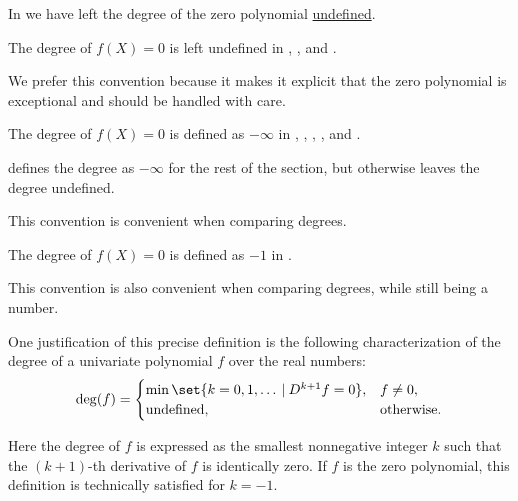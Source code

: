 \begin{remark}\label{rem:zero_polynomial_degree}
  In  we have left the degree of the zero polynomial \hyperref[con:undefinedness]{undefined}.

  \begin{thmenum}
     The degree of \( f(X) = 0 \) is left undefined in
    \cite[42]{Rotman2015AdvancedModernAlgebraPart1},
    \cite[118]{Тыртышников2017ОсновыАлгебры},
    \cite[132]{Курош1968КурсВысшейАлгебры} and
    \cite[22]{ГеновМиховскиМоллов1991Алгебра}.

    We prefer this convention because it makes it explicit that the zero polynomial is exceptional and should be handled with care.

     The degree of \( f(X) = 0 \) is defined as \( -\infty \) in
    \cite[97]{Lang2002Algebra},
    \cite[128]{Jacobson1985BasicAlgebraI},
    \cite[125]{Aluffi2009Algebra},
    \cite[28]{Ahlfors1979ComplexAnalysis},
    \cite[93]{Винберг2014КурсАлгебры} and
    \cite[183]{Кострикин2000АлгебраЧасть1}.

     defines the degree as \( -\infty \) for the rest of the section, but otherwise leaves the degree undefined.

    This convention is convenient when comparing degrees.

     The degree of \( f(X) = 0 \) is defined as \( -1 \) in
    \cite[10]{FriedbergInselSpence2018LinearAlgebra}.

    This convention is also convenient when comparing degrees, while still being a number.

    One justification of this precise definition is the following characterization of the degree of a univariate polynomial \( f \) over the real numbers:
    \begin{equation*}
      \deg(f) = \begin{cases}
        \min\set{ k = 0, 1, \ldots \given D^{k+1} f = 0 }, &f \neq 0, \\
        \T{undefined},                                     &\T{otherwise.}
      \end{cases}
    \end{equation*}

    Here the degree of \( f \) is expressed as the smallest nonnegative integer \( k \) such that the \( (k + 1) \)-th derivative of \( f \) is identically zero. If \( f \) is the zero polynomial, this definition is technically satisfied for \( k = -1 \).
  \end{thmenum}
\end{remark}

